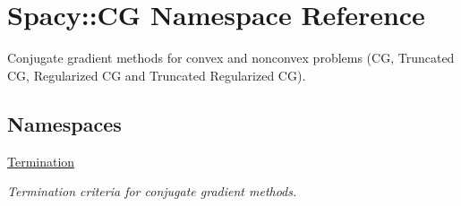 \hypertarget{namespaceSpacy_1_1CG}{\section{Spacy\-:\-:C\-G Namespace Reference}
\label{namespaceSpacy_1_1CG}
}


Conjugate gradient methods for convex and nonconvex problems (C\-G, Truncated C\-G, Regularized C\-G and Truncated Regularized C\-G).  


\subsection*{Namespaces}
\begin{DoxyCompactItemize}
\item 
\hyperlink{namespaceSpacy_1_1CG_1_1Termination}{Termination}
\begin{DoxyCompactList}\small\item\em Termination criteria for conjugate gradient methods. \end{DoxyCompactList}\end{DoxyCompactItemize}
